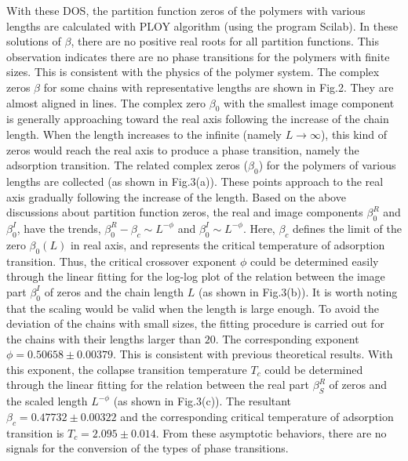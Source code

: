 \documentclass[aps,pre,twocolumn,showpacs,preprintnumbers,amsmath,amssymb]{revtex4-1}
\begin{document}
With these DOS, the partition function zeros of the polymers with various lengths are
calculated with PLOY algorithm (using the program Scilab). In these solutions of
$\beta$, there are no positive real roots for all partition functions.
This observation indicates
there are no phase transitions for the polymers with finite sizes. This is
consistent with the physics of the polymer system. The complex zeros $\beta$
for some chains with representative lengths are shown in Fig.2. They are
almost aligned in lines. The complex zero $\beta_0$ with the smallest image
component is generally approaching
toward the real axis following the increase of the chain length. When the
length increases to the infinite (namely $L\rightarrow\infty$), this kind of
zeros would reach the real axis to produce a phase transition, namely the
adsorption transition. The related complex zeros ($\beta_0$) for the
polymers of various lengths are collected (as shown in Fig.3(a)). These
points approach to the real axis gradually following the increase of the
length. Based on the above discussions about partition function zeros, the
real and image components $\beta_0^R$ and $\beta_0^I$, have the trends,
$\beta_0^R - \beta_c  \sim  L^{-\phi}$ and $\beta_0^I  \sim  L^{-\phi}$.
Here,
$\beta_c$ defines the limit of the zero $\beta_0(L)$ in real axis, and represents
the critical temperature of adsorption transition. Thus, the critical crossover exponent
$\phi$ could be determined easily through
the linear fitting for the log-log plot of the relation between the image
part $\beta_0^I$ of zeros and
the chain length $L$ (as shown in Fig.3(b)). It is worth noting that the
scaling would be valid when the length is large enough. To avoid the deviation
of the chains with small sizes, the fitting procedure is carried out for the
chains with their lengths larger than $20$. The corresponding exponent
$\phi=0.50658 \pm 0.00379$. This is consistent with previous theoretical
results\cite{PRL95}.
With this exponent, the collapse transition
temperature $T_c$ could be determined through the linear fitting for the
relation between the real part $\beta_S^R$ of zeros and the scaled length
$L^{-\phi}$ (as shown in Fig.3(c)). The resultant $\beta_c=0.47732 \pm 0.00322$
and the corresponding critical temperature of adsorption transition is
$T_c=2.095 \pm 0.014$. From these asymptotic behaviors, there are no signals
for the conversion of the types of phase transitions.
\end{document}
